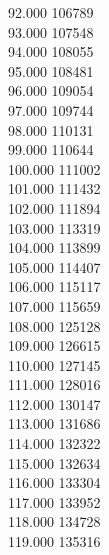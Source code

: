 { 92.000	106789 \\
 93.000	107548 \\
 94.000	108055 \\
 95.000	108481 \\
 96.000	109054 \\
 97.000	109744 \\
 98.000	110131 \\
 99.000	110644 \\
 100.000	111002 \\
 101.000	111432 \\
 102.000	111894 \\
 103.000	113319 \\
 104.000	113899 \\
 105.000	114407 \\
 106.000	115117 \\
 107.000	115659 \\
 108.000	125128 \\
 109.000	126615 \\
 110.000	127145 \\
 111.000	128016 \\
 112.000	130147 \\
 113.000	131686 \\
 114.000	132322 \\
 115.000	132634 \\
 116.000	133304 \\
 117.000	133952 \\
 118.000	134728 \\
 119.000	135316 \\
}

